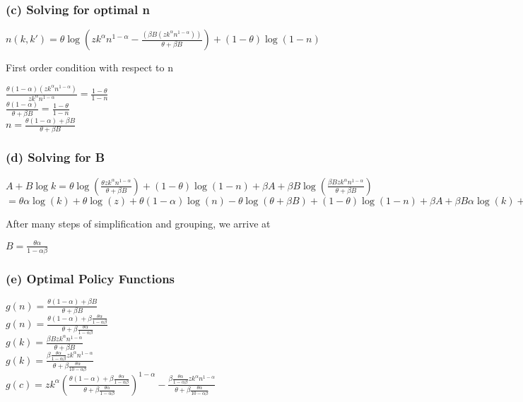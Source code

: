 \documentclass[10pt, a4paper]{article}
\begin{document}
    \subsubsection*{(c) Solving for optimal n}
    \begin{center}
      $n(k,k') = \theta\log(zk^{\alpha}n^{1-\alpha}-\frac{(\beta B(zk^{\alpha}n^{1-\alpha}))}{\theta+\beta B})+(1-\theta)\log(1-n)$ \\
    \end{center}
    First order condition with respect to n
    \begin{center}
      $\frac{\theta(1-\alpha)(zk^{\alpha}n^{1-\alpha})}{zk^{\alpha}n^{1-\alpha}} = \frac{1-\theta}{1-n}$ \\
      $\frac{\theta(1-\alpha)}{\theta+\beta B}=\frac{1-\theta}{1-n}$ \\
      $\boxed{n = \frac{\theta(1-\alpha)+\beta B}{\theta+\beta B}}$
    \end{center}
    \subsubsection*{(d) Solving for B}
    \begin{center}
      $A+B\log k = \theta\log(\frac{\theta zk^{\alpha}n^{1-\alpha}}{\theta+\beta B}) + (1-\theta)\log(1-n)+\beta A +\beta B\log(\frac{\beta Bzk^{\alpha}n^{1-\alpha}}{\theta+\beta B})$ \\
      $ = \theta\alpha\log(k)+\theta\log(z)+\theta(1-\alpha)\log(n)-\theta\log(\theta+\beta B)+(1-\theta)\log(1-n)+\beta A+\beta B\alpha\log(k)+\beta B\log(z)+(1-\alpha)\beta B\log(n)-\beta B\log(\theta+\beta B)$ \\
    \end{center}
    After many steps of simplification and grouping, we arrive at 
    \begin{center}
      $\boxed{B = \frac{\theta\alpha}{1-\alpha\beta}}$ 
    \end{center}
    \subsubsection*{(e) Optimal Policy Functions}
    \begin{center}
      $g(n) = \frac{\theta(1-\alpha)+\beta B}{\theta +\beta B}$ \\ 
      $\boxed{g(n) = \frac{\theta(1-\alpha)+\beta \frac{\theta\alpha}{1-\alpha\beta}}{\theta+\beta\frac{\theta\alpha}{1-\alpha\beta}}}$ \\
      $g(k) = \frac{\beta Bzk^{\alpha}n^{1-\alpha}}{\theta+\beta B}$ \\
      $\boxed{g(k) = \frac{\beta\frac{\theta\alpha}{1-\alpha\beta}zk^{\alpha}n^{1-\alpha}}{\theta+\beta\frac{\theta\alpha}{10-\alpha\beta}}}$ \\
      $\boxed{g(c) = zk^{\alpha}(\frac{\theta(1-\alpha)+\beta \frac{\theta\alpha}{1-\alpha\beta}}{\theta+\beta\frac{\theta\alpha}{1-\alpha\beta}})^{1-\alpha}-\frac{\beta\frac{\theta\alpha}{1-\alpha\beta}zk^{\alpha}n^{1-\alpha}}{\theta+\beta\frac{\theta\alpha}{10-\alpha\beta}}}$
    \end{center}
\end{document}
